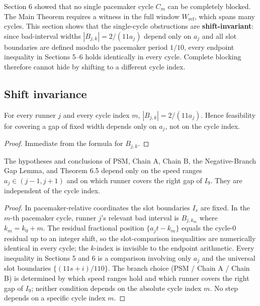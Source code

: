 \documentclass[12pt]{article}
\begin{document}
Section 6 showed that no single pacemaker cycle $C_m$ can be completely blocked.
The Main Theorem requires a witness in the full window $W_{\mathrm{ref}}$, which spans
many cycles. This section shows that the single-cycle obstructions are
\textbf{shift-invariant}: since bad-interval widths $|B_{j,k}|=2/(11a_j)$ depend only on
$a_j$ and all slot boundaries are defined modulo the pacemaker period $1/10$, every
endpoint inequality in Sections 5–6 holds identically in every cycle. Complete blocking
therefore cannot hide by shifting to a different cycle index.

\subsection{Shift invariance}

\begin{lemma}\label{l:71}
For every runner $j$ and every cycle index $m$, $|B_{j,k}|=2/(11a_j)$.
Hence feasibility for covering a gap of fixed width depends only on $a_j$, not on the
cycle index.

\end{lemma}
\begin{proof}
Immediate from the formula for $B_{j,k}$.
\end{proof}

\begin{lemma}\label{l:72}
The hypotheses and conclusions of PSM, Chain A, Chain B, the
Negative-Branch Gap Lemma, and Theorem 6.5 depend only on the speed ranges
$a_j\in(j-1,j+1)$ and on which runner covers the right gap of $I_9$. They are independent
of the cycle index.

\end{lemma}
\begin{proof}
In pacemaker-relative coordinates the slot boundaries $I_s$ are fixed. In the $m$-th
pacemaker cycle, runner $j$'s relevant bad interval is $B_{j,k_m}$ where $k_m=k_0+m$.
The residual fractional position $\{a_jt - k_m\}$ equals the cycle-0 residual up to an
integer shift, so the slot-comparison inequalities are numerically identical in every cycle;
the $k$-index is invisible to the endpoint arithmetic. Every inequality in Sections 5
and 6 is a comparison involving only $a_j$ and the universal slot boundaries
$\{(11s+i)/110\}$. The branch choice (PSM / Chain A / Chain B) is determined by which
speed ranges hold and which runner covers the right gap of $I_9$; neither condition depends
on the absolute cycle index $m$. No step depends on a specific cycle index $m$.
\end{proof}
\end{document}
